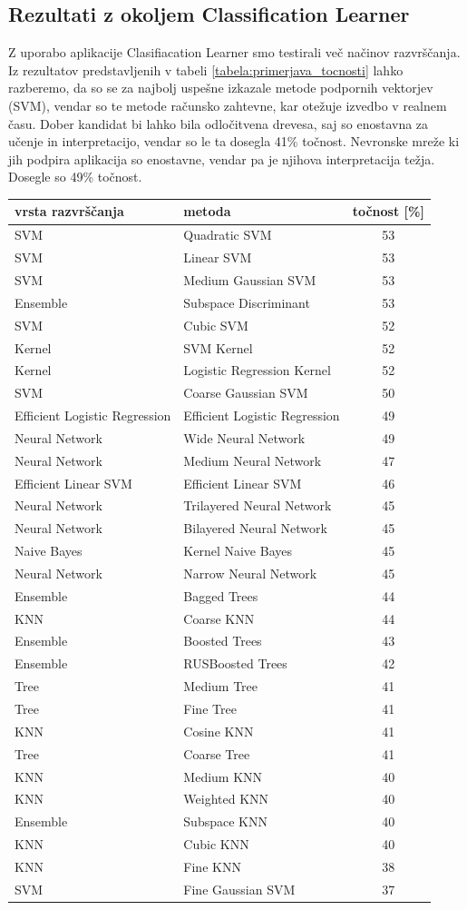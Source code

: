 \subsection{Rezultati z okoljem Classification Learner}
Z uporabo aplikacije Clasifiacation Learner smo testirali več načinov razvrščanja. Iz rezultatov predstavljenih v tabeli \ref{tabela:primerjava_tocnosti} lahko razberemo, da so se za najbolj uspešne izkazale metode podpornih vektorjev (SVM), vendar so te metode računsko zahtevne, kar otežuje izvedbo v realnem času. Dober kandidat bi lahko bila odločitvena drevesa, saj so enostavna za učenje in interpretacijo, vendar so le ta dosegla 41\% točnost. Nevronske mreže ki jih podpira aplikacija so enostavne, vendar pa je njihova interpretacija težja.  Dosegle so 49\% točnost.
\begin{table}
\centering
\begin{tabular}{|l|l|c|}
\hline
vrsta razvrščanja & metoda & točnost [\%] \\
\hline SVM&Quadratic SVM&53\\
\hline SVM&Linear SVM&53\\
\hline SVM&Medium Gaussian SVM&53\\
\hline Ensemble&Subspace Discriminant&53\\
\hline SVM&Cubic SVM&52\\
\hline Kernel&SVM Kernel&52\\
\hline Kernel&Logistic Regression Kernel&52\\
\hline SVM&Coarse Gaussian SVM&50\\
\hline Efficient Logistic Regression&Efficient Logistic Regression&49\\
\hline Neural Network&Wide Neural Network&49\\
\hline Neural Network&Medium Neural Network&47\\
\hline Efficient Linear SVM&Efficient Linear SVM&46\\
\hline Neural Network&Trilayered Neural Network&45\\
\hline Neural Network&Bilayered Neural Network&45\\
\hline Naive Bayes&Kernel Naive Bayes&45\\
\hline Neural Network&Narrow Neural Network&45\\
\hline Ensemble&Bagged Trees&44\\
\hline KNN&Coarse KNN&44\\
\hline Ensemble&Boosted Trees&43\\
\hline Ensemble&RUSBoosted Trees&42\\
\hline Tree&Medium Tree&41\\
\hline Tree&Fine Tree&41\\
\hline KNN&Cosine KNN&41\\
\hline Tree&Coarse Tree&41\\
\hline KNN&Medium KNN&40\\
\hline KNN&Weighted KNN&40\\
\hline Ensemble&Subspace KNN&40\\
\hline KNN&Cubic KNN&40\\
\hline KNN&Fine KNN&38\\
\hline SVM&Fine Gaussian SVM&37\\


\end{tabular}
\end{table}
